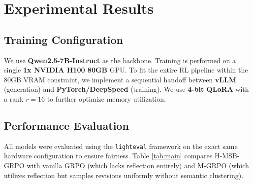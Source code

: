\documentclass[letterpaper]{article}
\begin{document}
\section{Experimental Results}

\subsection{Training Configuration}
We use \textbf{Qwen2.5-7B-Instruct} as the backbone. Training is performed on a single \textbf{1x NVIDIA H100 80GB} GPU. To fit the entire RL pipeline within the 80GB VRAM constraint, we implement a sequential handoff between \textbf{vLLM} (generation) and \textbf{PyTorch/DeepSpeed} (training). We use \textbf{4-bit QLoRA} with a rank $r=16$ to further optimize memory utilization.

\subsection{Performance Evaluation}
All models were evaluated using the \texttt{lighteval} framework on the exact same hardware configuration to ensure fairness. Table \ref{tab:main} compares H-MSB-GRPO with vanilla GRPO (which lacks reflection entirely) and M-GRPO (which utilizes reflection but samples revisions uniformly without semantic clustering).

\begin{table}[ht]
\centering
\caption{Pass@1 Accuracy (\%) on Advanced Reasoning Benchmarks (1 Sample).}
\label{tab:main}
\end{table}

\begin{table}[ht]
\centering
\caption{Pass@1 Accuracy (\%) on Advanced Reasoning Benchmarks (4 Samples).}
\label{tab:pass4}
\end{table}
\end{document}

